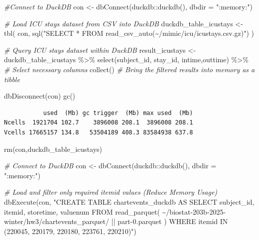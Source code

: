 \documentclass[
]{article}
\newenvironment{Shaded}{\begin{snugshade}}{\end{snugshade}}
\newcommand{\AttributeTok}[1]{\textcolor[rgb]{0.77,0.63,0.00}{#1}}
\newcommand{\CommentTok}[1]{\textcolor[rgb]{0.56,0.35,0.01}{\textit{#1}}}
\newcommand{\FunctionTok}[1]{\textcolor[rgb]{0.00,0.00,0.00}{#1}}
\newcommand{\NormalTok}[1]{\textcolor[rgb]{0.00,0.00,0.00}{#1}}
\newcommand{\OtherTok}[1]{\textcolor[rgb]{0.56,0.35,0.01}{#1}}
\newcommand{\SpecialCharTok}[1]{\textcolor[rgb]{0.00,0.00,0.00}{#1}}
\newcommand{\StringTok}[1]{\textcolor[rgb]{0.31,0.60,0.02}{#1}}
\begin{document}
\begin{Shaded}
\begin{Highlighting}[]
\CommentTok{\#Connect to DuckDB}
\NormalTok{con }\OtherTok{\textless{}{-}} \FunctionTok{dbConnect}\NormalTok{(duckdb}\SpecialCharTok{::}\FunctionTok{duckdb}\NormalTok{(), }\AttributeTok{dbdir =} \StringTok{":memory:"}\NormalTok{)}

\CommentTok{\# Load ICU stays dataset from CSV into DuckDB}
\NormalTok{duckdb\_table\_icustays }\OtherTok{\textless{}{-}} \FunctionTok{tbl}\NormalTok{(}
\NormalTok{  con, }\FunctionTok{sql}\NormalTok{(}\StringTok{"SELECT * FROM read\_csv\_auto(\textquotesingle{}\textasciitilde{}/mimic/icu/icustays.csv.gz\textquotesingle{})"}\NormalTok{)}
\NormalTok{  )}

\CommentTok{\# Query ICU stays dataset within DuckDB}
\NormalTok{result\_icustays }\OtherTok{\textless{}{-}}\NormalTok{ duckdb\_table\_icustays }\SpecialCharTok{\%\textgreater{}\%}
  \FunctionTok{select}\NormalTok{(subject\_id, stay\_id, intime,outtime) }\SpecialCharTok{\%\textgreater{}\%}  \CommentTok{\# Select necessary columns}
  \FunctionTok{collect}\NormalTok{()  }\CommentTok{\# Bring the filtered results into memory as a tibble}

\FunctionTok{dbDisconnect}\NormalTok{(con)}
\FunctionTok{gc}\NormalTok{()}
\end{Highlighting}
\end{Shaded}

\begin{verbatim}
           used  (Mb) gc trigger  (Mb) max used  (Mb)
Ncells  1921704 102.7    3896008 208.1  3896008 208.1
Vcells 17665157 134.8   53504189 408.3 83584938 637.8
\end{verbatim}

\begin{Shaded}
\begin{Highlighting}[]
\FunctionTok{rm}\NormalTok{(con,duckdb\_table\_icustays)}
\end{Highlighting}
\end{Shaded}

\begin{Shaded}
\begin{Highlighting}[]
\CommentTok{\# Connect to DuckDB}
\NormalTok{con }\OtherTok{\textless{}{-}} \FunctionTok{dbConnect}\NormalTok{(duckdb}\SpecialCharTok{::}\FunctionTok{duckdb}\NormalTok{(), }\AttributeTok{dbdir =} \StringTok{":memory:"}\NormalTok{) }

\CommentTok{\#  Load and filter only required \textasciigrave{}itemid\textasciigrave{} values (Reduce Memory Usage)}
\FunctionTok{dbExecute}\NormalTok{(con, }\StringTok{"CREATE TABLE chartevents\_duckdb AS }
\StringTok{                SELECT subject\_id, itemid, storetime, valuenum }
\StringTok{                FROM read\_parquet(}
\StringTok{    \textquotesingle{}\textasciitilde{}/biostat{-}203b{-}2025{-}winter/hw3/chartevents\_parquet/\textquotesingle{} || }
\StringTok{    \textquotesingle{}part{-}0.parquet\textquotesingle{}}
\StringTok{  )}
\StringTok{                WHERE itemid IN (220045, 220179, 220180, 223761, 220210)"}\NormalTok{)}
\end{Highlighting}
\end{Shaded}
\end{document}
